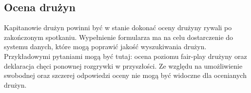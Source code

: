 \subsection{Ocena drużyn}

Kapitanowie drużyn powinni być w stanie dokonać oceny drużyny rywali po zakończonym spotkaniu. Wypełnienie formularza ma na celu dostarczenie do systemu danych, które mogą poprawić jakość wyszukiwania drużyn. Przykładowymi pytaniami mogą być tutaj: ocena poziomu fair-play drużyny oraz deklaracja chęci ponownej rozgrywki w przyszłości. Ze względu na umożliwienie swobodnej oraz szczerej odpowiedzi oceny nie mogą być widoczne dla ocenianych drużyn.
